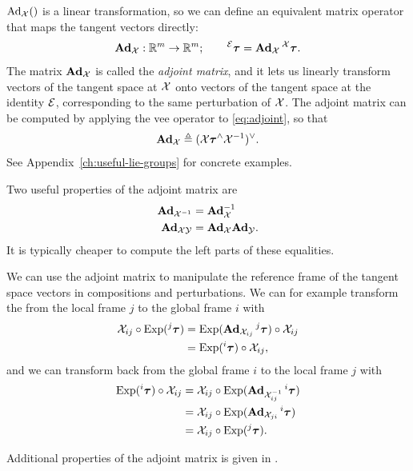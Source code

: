 $\operatorname{Ad}_{\mathcal{X}}()$ is a linear transformation, so we can define an equivalent matrix operator that maps the tangent vectors directly:
\begin{equation}
  \boldsymbol{\mathbf{Ad}}_{\mathcal{X}}: {\mathbb R}^m \to {\mathbb R}^m; \quad\quad \prescript{\mathcal{E}}{}{{\boldsymbol{\mathbf{\tau}}}} = \boldsymbol{\mathbf{Ad}}_{\mathcal{X}} \prescript{\mathcal{X}}{}{{\boldsymbol{\mathbf{\tau}}}}.
\end{equation}
The matrix $\boldsymbol{\mathbf{Ad}}_{\mathcal{X}}$ is called the \emph{adjoint matrix}, and it lets us linearly transform vectors of the tangent space at $\mathcal{X}$ onto vectors of the tangent space at the identity $\mathcal{E}$, corresponding to the same perturbation of $\mathcal{X}$.
The adjoint matrix can be computed by applying the vee operator to \eqref{eq:adjoint}, so that
\begin{equation} \label{eq:adjoint-matrix}
  \boldsymbol{\mathbf{Ad}}_{\mathcal{X}} \triangleq (\mathcal{X} {\boldsymbol{\mathbf{\tau}}}^\wedge \mathcal{X}^{-1})^\vee.
\end{equation}
See Appendix~\ref{ch:useful-lie-groups} for concrete examples.

Two useful properties of the adjoint matrix are
\begin{align}
    \boldsymbol{\mathbf{Ad}}_{\mathcal{X}^{-1}} &= \boldsymbol{\mathbf{Ad}}_{\mathcal{X}}^{-1}\\
    \boldsymbol{\mathbf{Ad}}_{\mathcal{X} \mathcal{Y}} &= \boldsymbol{\mathbf{Ad}}_{\mathcal{X}} \boldsymbol{\mathbf{Ad}}_{\mathcal{Y}}.
\end{align}
It is typically cheaper to compute the left parts of these equalities.

We can use the adjoint matrix to manipulate the reference frame of the tangent space vectors in compositions and perturbations.
We can for example transform the from the local frame $j$ to the global frame $i$ with
\begin{align}
    \mathcal{X}_{ij} \circ \operatorname*{Exp}(\prescript{j}{}{{\boldsymbol{\mathbf{\tau}}}})
    &= \operatorname*{Exp}(\boldsymbol{\mathbf{Ad}}_{\mathcal{X}_{ij}} \prescript{j}{}{{\boldsymbol{\mathbf{\tau}}}}) \circ \mathcal{X}_{ij}\\
    &= \operatorname*{Exp}(\prescript{i}{}{{\boldsymbol{\mathbf{\tau}}}}) \circ \mathcal{X}_{ij},
\end{align}
and we can transform back from the global frame $i$ to the local frame $j$ with
\begin{align}
    \operatorname*{Exp}(\prescript{i}{}{{\boldsymbol{\mathbf{\tau}}}}) \circ \mathcal{X}_{ij}
    &= \mathcal{X}_{ij} \circ \operatorname*{Exp}(\boldsymbol{\mathbf{Ad}}_{\mathcal{X}_{ij}^{-1}} \prescript{i}{}{{\boldsymbol{\mathbf{\tau}}}})\\  
    &= \mathcal{X}_{ij} \circ \operatorname*{Exp}(\boldsymbol{\mathbf{Ad}}_{\mathcal{X}_{ji}} \prescript{i}{}{{\boldsymbol{\mathbf{\tau}}}})\\ 
    &= \mathcal{X}_{ij} \circ \operatorname*{Exp}(\prescript{j}{}{{\boldsymbol{\mathbf{\tau}}}}).
\end{align}

Additional properties of the adjoint matrix is given in \cite{SolaARobotics, barfoot2017state}.


